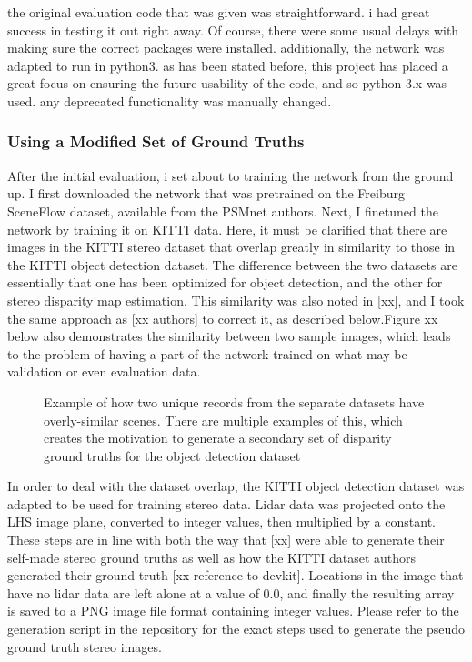 the original evaluation code that was given was straightforward. i had great success in testing it out right away. Of course, there were some usual delays with making sure the correct packages were installed. additionally, the network was adapted to run in python3. as has been stated before, this project has placed a great focus on ensuring the future usability of the code, and so python 3.x was used. any deprecated functionality was manually changed. 

\subsubsection{Using a Modified Set of Ground Truths}
After the initial evaluation, i set about to training the network from the ground up. I first downloaded the network that was pretrained on the Freiburg SceneFlow dataset, available from the PSMnet authors. Next, I finetuned the network by training it on KITTI data. Here, it must be clarified that there are images in the KITTI stereo dataset that overlap greatly in similarity to those in the KITTI object detection dataset. The difference between the two datasets are essentially that one has been optimized for object detection, and the other for stereo disparity map estimation. This similarity was also noted in [xx], and I took the same approach as [xx authors] to correct it, as described below.Figure xx below also demonstrates the similarity between two sample images, which leads to the problem of having a part of the network trained on what may be validation or even evaluation data. 

\begin{figure}[H]
    \centering  
    \label{similarity_stereo_objdet}
    \caption{Example of how two unique records from the separate datasets have overly-similar scenes. There are multiple examples of this, which creates the motivation to generate a secondary set of disparity ground truths for the object detection dataset}
\end{figure}

In order to deal with the dataset overlap, the KITTI object detection dataset was adapted to be used for training stereo data. Lidar data was projected onto the LHS image plane, converted to integer values, then multiplied by a constant. These steps are in line with both the way that [xx] were able to generate their self-made stereo ground truths as well as how the KITTI dataset authors generated their ground truth [xx reference to devkit]. Locations in the image that have no lidar data are left alone at a value of 0.0, and finally the resulting array is saved to a PNG image file format containing integer values. Please refer to the generation script in the repository for the exact steps used to generate the pseudo ground truth stereo images.

